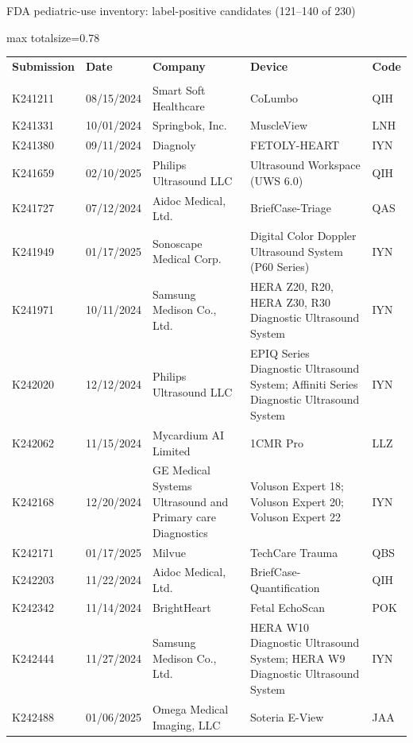 \documentclass[aspectratio=169]{beamer}
\renewcommand{\arraystretch}{1.08}
\begin{document}
\begin{frame}[category=FDA appendix]{FDA pediatric-use inventory: label-positive candidates (121--140 of 230)}
\begin{adjustbox}{max totalsize={\textwidth}{0.78\textheight}}
\renewcommand{\arraystretch}{1.2}
\begin{tabular}{|p{}|p{}|p{}|p{}|p{}|}
\hline \textbf{Submission} & \textbf{Date} & \textbf{Company} & \textbf{Device} & \textbf{Code} \\\\ \hline
K241211 & 08/15/2024 & Smart Soft Healthcare & CoLumbo & QIH \\ \hline
K241331 & 10/01/2024 & Springbok, Inc. & MuscleView & LNH \\ \hline
K241380 & 09/11/2024 & Diagnoly & FETOLY-HEART & IYN \\ \hline
K241659 & 02/10/2025 & Philips Ultrasound LLC & Ultrasound Workspace (UWS 6.0) & QIH \\ \hline
K241727 & 07/12/2024 & Aidoc Medical, Ltd. & BriefCase-Triage & QAS \\ \hline
K241949 & 01/17/2025 & Sonoscape Medical Corp. & Digital Color Doppler Ultrasound System (P60 Series) & IYN \\ \hline
K241971 & 10/11/2024 & Samsung Medison Co., Ltd. & HERA Z20, R20, HERA Z30, R30 Diagnostic Ultrasound System & IYN \\ \hline
K242020 & 12/12/2024 & Philips Ultrasound LLC & EPIQ Series Diagnostic Ultrasound System; Affiniti Series Diagnostic Ultrasound System & IYN \\ \hline
K242062 & 11/15/2024 & Mycardium AI Limited & 1CMR Pro & LLZ \\ \hline
K242168 & 12/20/2024 & GE Medical Systems Ultrasound and Primary care Diagnostics & Voluson Expert 18; Voluson Expert 20; Voluson Expert 22 & IYN \\ \hline
K242171 & 01/17/2025 & Milvue & TechCare Trauma & QBS \\ \hline
K242203 & 11/22/2024 & Aidoc Medical, Ltd. & BriefCase-Quantification & QIH \\ \hline
K242342 & 11/14/2024 & BrightHeart & Fetal EchoScan & POK \\ \hline
K242444 & 11/27/2024 & Samsung Medison Co., Ltd. & HERA W10 Diagnostic Ultrasound System; HERA W9 Diagnostic Ultrasound System & IYN \\ \hline
K242488 & 01/06/2025 & Omega Medical Imaging, LLC & Soteria E-View & JAA \\ \hline

\end{tabular}
\end{adjustbox}
\end{frame}
\end{document}
